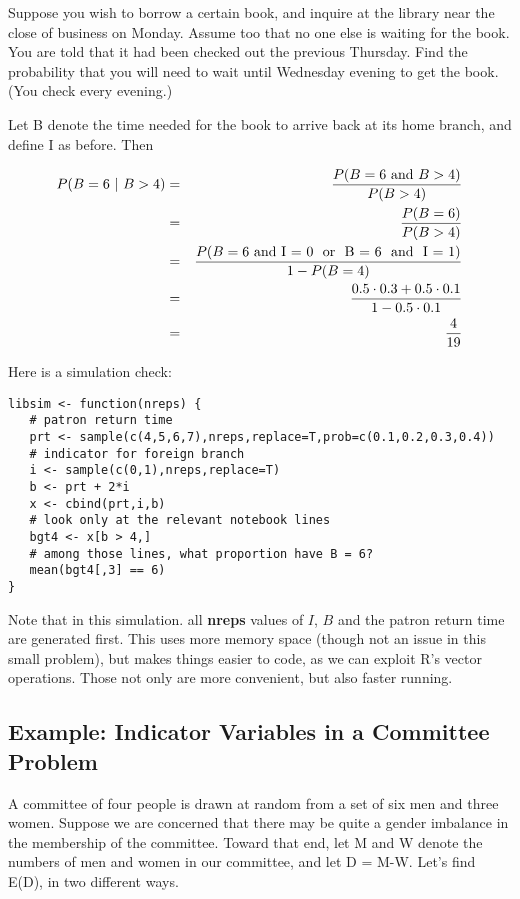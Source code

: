 Suppose you wish to borrow a certain book, and inquire at the library
near the close of business on Monday. Assume too that no one else is
waiting for the book.  You are told that it had been checked out the
previous Thursday. Find the probability that you will need to wait until
Wednesday evening to get the book. (You check every evening.)

Let B denote the time needed for the book to arrive back at its home
branch, and define I as before.  Then

\begin{eqnarray}
P(B = 6 ~|~ B > 4) &=& \frac{P(B = 6 \textrm{ and } B > 4)}{P(B > 4)}\\ 
&=& \frac{P(B = 6)}{P(B > 4)} \\
&=& \frac{P(B = 6 \textrm{ and I = 0 \textrm{ or } B = 6 \textrm{ and }
I = 1})}
{1 - P(B = 4)} \\
&=& \frac{0.5 \cdot 0.3 + 0.5 \cdot 0.1}
{1 - 0.5 \cdot 0.1} \\
&=& \frac{4}{19}
\end{eqnarray}

Here is a simulation check:

\begin{lstlisting}
libsim <- function(nreps) {
   # patron return time
   prt <- sample(c(4,5,6,7),nreps,replace=T,prob=c(0.1,0.2,0.3,0.4))
   # indicator for foreign branch
   i <- sample(c(0,1),nreps,replace=T)
   b <- prt + 2*i
   x <- cbind(prt,i,b)
   # look only at the relevant notebook lines
   bgt4 <- x[b > 4,]
   # among those lines, what proportion have B = 6?
   mean(bgt4[,3] == 6)
}                               
\end{lstlisting}

Note that in this simulation. all {\bf nreps} values of $I$, $B$ and the
patron return time are generated first.  This uses more memory space
(though not an issue in this small problem), but makes things easier to
code, as we can exploit R's vector operations.  Those not only are more
convenient, but also faster running.

\subsection{Example:  Indicator Variables in a Committee Problem}
\label{combex}

A committee of four people is drawn at random from a set of six men and
three women.  Suppose we are concerned that there may be quite a gender
imbalance in the membership of the committee.  Toward that end, let M
and W denote the numbers of men and women in our committee, and let D =
M-W.  Let's find E(D), in two different ways.

